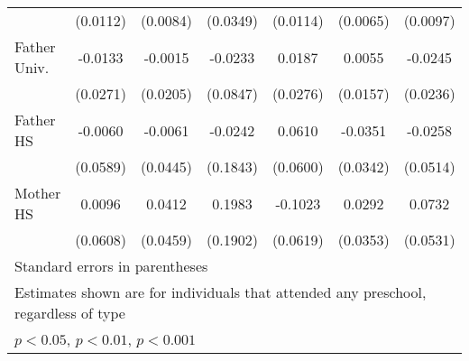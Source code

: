 \begin{table}[htbp]
\begin{tabular}{l*{6}{c}}
            &    (0.0112)         &    (0.0084)         &    (0.0349)         &    (0.0114)         &    (0.0065)         &    (0.0097)         \\
\addlinespace
Father Univ.&     -0.0133         &     -0.0015         &     -0.0233         &      0.0187         &      0.0055         &     -0.0245         \\
            &    (0.0271)         &    (0.0205)         &    (0.0847)         &    (0.0276)         &    (0.0157)         &    (0.0236)         \\
\addlinespace
Father HS   &     -0.0060         &     -0.0061         &     -0.0242         &      0.0610         &     -0.0351         &     -0.0258         \\
            &    (0.0589)         &    (0.0445)         &    (0.1843)         &    (0.0600)         &    (0.0342)         &    (0.0514)         \\
\addlinespace
Mother HS   &      0.0096         &      0.0412         &      0.1983         &     -0.1023         &      0.0292         &      0.0732         \\
            &    (0.0608)         &    (0.0459)         &    (0.1902)         &    (0.0619)         &    (0.0353)         &    (0.0531)         \\
\bottomrule
\multicolumn{7}{l}{\footnotesize Standard errors in parentheses}\\
\multicolumn{7}{l}{\footnotesize Estimates shown are for individuals that attended any preschool, regardless of type}\\
\multicolumn{7}{l}{\footnotesize \sym{*} \(p<0.05\), \sym{**} \(p<0.01\), \sym{***} \(p<0.001\)}\\
\end{tabular}
\end{table}
